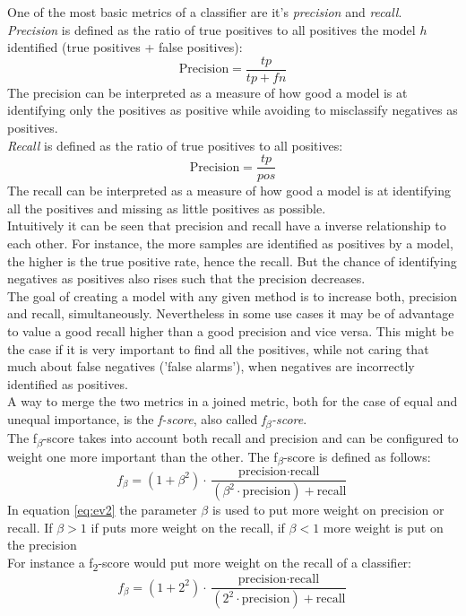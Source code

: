 One of the most basic metrics of a classifier are it's \emph{precision} and \emph{recall}.\\
\emph{Precision} is defined as the ratio of true positives to all positives the model $h$ identified (true positives + false positives):
\begin{equation} \label{eq:ev1}
\text{Precision}=\frac{tp}{tp+fn}
\end{equation}
The precision can be interpreted as a measure of how good a model is at identifying only the positives as positive while avoiding to misclassify negatives as positives. 
\\
\emph{Recall} is defined as the ratio of true positives to all positives:
\begin{equation} \label{eq:ev1}
\text{Precision}=\frac{tp}{pos}
\end{equation}
The recall can be interpreted as a measure of how good a model is at identifying all the positives and missing as little positives as possible.
\\

Intuitively it can be seen that precision and recall have a inverse relationship to each other. For instance, the more samples are identified as positives by a model, the higher is the true positive rate, hence the recall. But the chance of identifying negatives as positives also rises such that the precision decreases.
\\
The goal of creating a model with any given method is to increase both, precision and recall, simultaneously. Nevertheless in some use cases it may be of advantage to value a good recall higher than a good precision and vice versa. This might be the case if it is very important to find all the positives, while not caring that much about false negatives ('false alarms'), when negatives are incorrectly identified as positives.
\\

A way to merge the two metrics in a joined metric, both for the case of equal and  unequal importance, is the \emph{f-score}, also called \emph{f\textsubscript{$\beta$}-score}.
\\
The f\textsubscript{$\beta$}-score takes into account both recall and precision and can be configured to weight one more important than the other. The f\textsubscript{$\beta$}-score is defined as follows:
\begin{equation} \label{eq:ev2}
f_\beta = (1+\beta^2) \cdot \frac{\text{precision} \cdot \text{recall}}{(\beta^2 \cdot \text{precision}) + \text{recall}}
\end{equation}
In equation \ref{eq:ev2} the parameter $\beta$ is used to put more weight on precision or recall. If  $\beta>1$ if puts more weight on the recall,  if  $\beta<1$ more weight is put on the precision\\
For instance a f\textsubscript{2}-score  would put more weight on the recall of a classifier:
\begin{equation} \label{eq:ev3}
f_\beta = (1+2^2) \cdot \frac{\text{precision} \cdot \text{recall}}{(2^2 \cdot \text{precision}) + \text{recall}}
\end{equation}	

